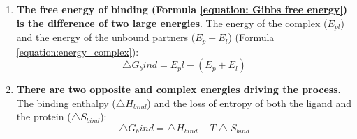 \documentclass[11pt, b5paper,twoside]{tesi_upf}
\begin{document}
\begin{enumerate}
\item \textbf{The free energy of binding (Formula \ref{equation: Gibbs free energy}) is the difference of two large energies}. The energy of the complex ($E_{pl}$) and the energy of the unbound partners ($E_{p} + E_{l}$) (Formula \ref{equation:energy_complex}): 
\begin{equation}\label{equation:energy_complex}
\bigtriangleup G_bind=E_pl - (E_{p} + E_{l}) 
\end{equation}
\item \textbf{There are two opposite and complex energies driving the process}. The binding enthalpy ($\bigtriangleup H_{bind}$) and the loss of entropy of both the ligand and the protein ($\bigtriangleup S_{bind}$): 
\begin{equation}\label{equation:energy_enthalpy_entropy}
\bigtriangleup G_bind= \bigtriangleup H_{bind} -  T\bigtriangleup S_{bind} 
\end{equation}


\end{enumerate}
\end{document}
